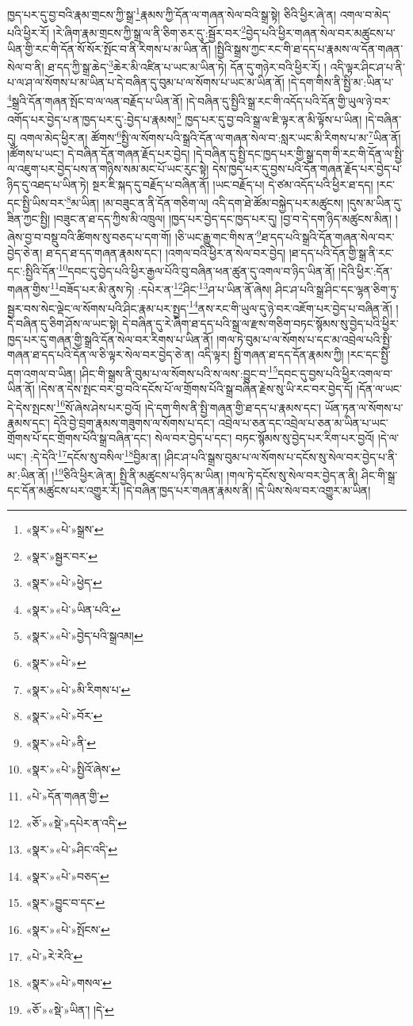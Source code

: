 ཁྱད་པར་དུ་བྱ་བའི་རྣམ་གྲངས་ཀྱི་སྒྲ་\footnote{«སྣར་»«པེ་»སྒྲས་}རྣམས་ཀྱི་དོན་ལ་གཞན་སེལ་བའི་སྒྲ་སྟེ། ཅིའི་ཕྱིར་ཞེ་ན། འགལ་བ་མེད་པའི་ཕྱིར་རོ། །རེ་ཞིག་རྣམ་གྲངས་ཀྱི་སྒྲ་ལ་ནི་ཅིག་ཅར་དུ་:སྦྱོར་བར་\footnote{«སྣར་»སྦྱར་བར་}བྱེད་པའི་ཕྱིར་གཞན་སེལ་བར་མཚུངས་པ་ཡིན་གྱི་རང་གི་དོན་སོ་སོར་སྤོང་བ་ནི་རིགས་པ་མ་ཡིན་ནོ། །སྤྱིའི་སྒྲས་ཀྱང་རང་གི་ཐ་དད་པ་རྣམས་ལ་དོན་གཞན་སེལ་བ་ནི། ཐ་དད་ཀྱི་སྒྲ་ཆེད་\footnote{«སྣར་»«པེ་»ཕྱེད་}ཆེར་མི་འཛིན་པ་ཡང་མ་ཡིན་ཏེ། དོན་དུ་གཉེར་བའི་ཕྱིར་རོ། །
འདི་ལྟར་ཤིང་ཤ་པ་ནི་པ་ལ་ཤ་ལ་སོགས་པ་མ་ཡིན་པ་དེ་བཞིན་དུ་བུམ་པ་ལ་སོགས་པ་ཡང་མ་ཡིན་ནོ། །དེ་དག་གིས་ནི་སྤྱི་མ་:ཡིན་པ་\footnote{«སྣར་»«པེ་»ཡིན་པའི་}སྒྲའི་དོན་གཞན་སྤོང་བ་ལ་ལན་བརྗོད་པ་ཡིན་ནོ། །དེ་བཞིན་དུ་སྤྱིའི་སྒྲ་རང་གི་འདོད་པའི་དོན་གྱི་ཡུལ་ཉེ་བར་འགོད་པར་བྱེད་པ་ན་ཁྱད་པར་དུ་:བྱེད་པ་རྣམས།\footnote{«སྣར་»«པེ་»བྱེད་པའི་སྒྲའམ།} ཁྱད་པར་དུ་བྱ་བའི་སྒྲ་ལ་ཇི་ལྟར་ན་མི་ལྟོས་པ་ཡིན། །དེ་བཞིན་དུ། འགལ་མེད་ཕྱིར་ན། ཚོགས་\footnote{«སྣར་»«པེ་»}སྤྱི་ལ་སོགས་པའི་སྒྲའི་དོན་ལ་གཞན་སེལ་བ་:སླར་ཡང་མི་རིགས་པ་མ་\footnote{«སྣར་»«པེ་»མི་རིགས་པ་}ཡིན་ནོ། །ཚོགས་པ་ཡང་། དེ་བཞིན་དོན་གཞན་རྗོད་པར་བྱེད། །དེ་བཞིན་དུ་སྤྱི་དང་ཁྱད་པར་གྱི་སྒྲ་དག་གི་རང་གི་དོན་ལ་སྤྱི་ལ་འཇུག་པར་བྱེད་པས་ན་གཉིས་སམ་མང་པོ་ཡང་རུང་སྟེ། དེས་ཁྱད་པར་དུ་བྱས་པའི་དོན་གཞན་རྗོད་པར་བྱེད་པ་ཉིད་དུ་འཐད་པ་ཡིན་ཏེ། སྔར་ཇི་སྐད་དུ་བརྗོད་པ་བཞིན་ནོ། །ཡང་བརྗོད་པ། དེ་ཙམ་འདོད་པའི་ཕྱིར་ཐ་དད། །རང་དང་སྤྱི་ཡིས་བར་\footnote{«སྣར་»«པེ་»བོར་}མ་ཡིན། །མ་བཟུང་ན་ནི་དོན་གཅིག་ལ། འདི་དག་ཐེ་ཚོམ་བསྐྱེད་པར་མཚུངས། །དུས་མ་ཡིན་དུ་ཟིན་ཀྱང་སྤྱི། །བཟུང་ན་ཐ་དད་ཀྱིས་མི་འཁྲུལ། །ཁྱད་པར་བྱེད་དང་ཁྱད་པར་དུ། །བྱ་བ་དེ་དག་ཉིད་མཚུངས་མིན། །ཞེས་བྱ་བ་བསྡུ་བའི་ཚིགས་སུ་བཅད་པ་དག་གོ། །ཅི་ཡང་རྒྱུ་གང་གིས་ན་\footnote{«སྣར་»«པེ་»ནི་}ཐ་དད་པའི་སྒྲའི་དོན་གཞན་སེལ་བར་བྱེད་ཅེ་ན། ཐ་དད་ཐ་དད་གཞན་རྣམས་དང་། །འགལ་བའི་ཕྱིར་ན་སེལ་བར་བྱེད། །ཐ་དད་པའི་དོན་གྱི་སྒྲ་ནི་རང་དང་:སྤྱིའི་དོན་\footnote{«སྣར་»«པེ་»སྤྱིའོ་ཞེས་}དབང་དུ་བྱེད་པའི་ཕྱིར་རྒྱལ་པོའི་བུ་བཞིན་ཕན་ཚུན་དུ་འགལ་བ་ཉིད་ཡིན་ནོ། །དེའི་ཕྱིར་:དོན་གཞན་གྱིས་\footnote{«པེ་»དོན་གཞན་གྱི་}བཟོད་པར་མི་ནུས་ཏེ། :དཔེར་ན་\footnote{«ཅོ་»«སྡེ་»དཔེར་ན་འདི་}ཤིང་\footnote{«སྣར་»«པེ་»ཤིང་འདི་}ཤ་པ་ཡིན་ནོ་ཞེས། ཤིང་ཤ་པའི་སྒྲ་ཤིང་དང་ལྷན་ཅིག་ཏུ་སྦྱར་བས་སེང་ལྡེང་ལ་སོགས་པའི་ཤིང་རྣམ་པར་སྤྱད་\footnote{«སྣར་»«པེ་»བཅད་}ནས་རང་གི་ཡུལ་དུ་ཉེ་བར་འཇོག་པར་བྱེད་པ་བཞིན་ནོ། །དེ་བཞིན་དུ་ཅིག་ཤོས་ལ་ཡང་སྟེ། དེ་བཞིན་དུ་རེ་ཞིག་ཐ་དད་པའི་སྒྲ་ལ་རྫས་གཅིག་བཏང་སྙོམས་སུ་བྱེད་པའི་ཕྱིར་ཁྱད་པར་དུ་གཞན་གྱི་སྒྲའི་དོན་སེལ་བར་རིགས་པ་ཡིན་ནོ། །གལ་ཏེ་བུམ་པ་ལ་སོགས་པ་དང་མ་འབྲེལ་པའི་སྤྱི་གཞན་ཐ་དད་པའི་དོན་ལ་ཅི་ལྟར་སེལ་བར་བྱེད་ཅེ་ན། འདི་ལྟར། སྤྱི་གཞན་ཐ་དད་དོན་རྣམས་ཀྱི། །རང་དང་སྤྱི་དག་འགལ་བ་ཡིན། །ཤིང་གི་སྒྲས་ནི་བུམ་པ་ལ་སོགས་པའི་ས་ལས་:བྱུང་བ་\footnote{«སྣར་»བྱུང་བ་དང་}དབང་དུ་བྱས་པའི་ཕྱིར་འགལ་བ་ཡིན་ནོ། །དེས་ན་དེས་སྤང་བར་བྱ་བའི་དངོས་པོ་ལ་གྲོགས་པོའི་སྒྲ་བཞིན་རྗེས་སུ་ཡི་རང་བར་བྱེད་དོ། །དོན་ལ་ཡང་དེ་དེས་སྤངས་\footnote{«སྣར་»«པེ་»སྤོངས་}སོ་ཞེས་ཤེས་པར་བྱའོ། །དེ་དག་གིས་ནི་སྤྱི་གཞན་གྱི་ཐ་དད་པ་རྣམས་དང་། ཡོན་ཏན་ལ་སོགས་པ་རྣམས་དང་། དེའི་བྱེ་བྲག་རྣམས་གཟུགས་ལ་སོགས་པ་དང་། འབྲེལ་པ་ཅན་དང་འབྲེལ་པ་ཅན་མ་ཡིན་པ་ཡང་གྲོགས་པོ་དང་གྲོགས་པོའི་སྒྲ་བཞིན་དང་། སེལ་བར་བྱེད་པ་དང་། བཏང་སྙོམས་སུ་བྱེད་པར་རིག་པར་བྱའོ། །དེ་ལ་ཡང་། :དེ་དེའི་\footnote{«པེ་»རེ་རེའི་}དངོས་སུ་བསིལ་\footnote{«སྣར་»«པེ་»གསལ་}བྱིམ་ན། །ཤིང་ཤ་པའི་སྒྲས་བུམ་པ་ལ་སོགས་པ་དངོས་སུ་སེལ་བར་བྱེད་པ་ནི་མ་:ཡིན་ནོ། །\footnote{«ཅོ་»«སྡེ་»ཡིན་། །དེ་}ཅིའི་ཕྱིར་ཞེ་ན། སྤྱི་ནི་མཚུངས་པ་ཉིད་མ་ཡིན། །གལ་ཏེ་དངོས་སུ་སེལ་བར་བྱེད་ན་ནི། ཤིང་གི་སྒྲ་དང་དོན་མཚུངས་པར་འགྱུར་རོ། །དེ་བཞིན་ཁྱད་པར་གཞན་རྣམས་ནི། །དེ་ཡིས་སེལ་བར་འགྱུར་མ་ཡིན། 
